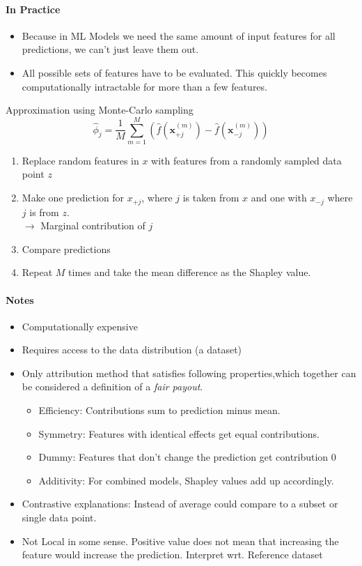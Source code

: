 \paragraph{In Practice}
\begin{itemize}
	\item Because in ML Models we need the same amount of input features for all predictions, we can't just leave them out.
	\item All possible sets of features have to be evaluated. This quickly becomes computationally intractable for more than a few features.
\end{itemize}
Approximation using Monte-Carlo sampling
\begin{equation}
	\hat{\phi}_{j} = \frac{1}{M}\sum_{m=1}^M\left(\hat{f}(\mathbf{x}^{(m)}_{+j}) - \hat{f}(\mathbf{x}^{(m)}_{-j})\right)
	\label{eq:mc-shapley}
\end{equation}
\begin{enumerate}
	\item Replace random features in $x$ with features from a randomly sampled data point $z$
	\item Make one prediction for $x_{+j}$, where $j$ is taken from $x$ and one with $x_{-j}$ where $j$ is from $z$.
	      \\ $\to$ Marginal contribution of $j$
	\item Compare predictions
	\item Repeat $M$ times and take the mean difference as the Shapley value.
\end{enumerate}
\paragraph{Notes}
\begin{itemize}
	\item Computationally expensive
	\item Requires access to the data distribution (a dataset)
	\item Only attribution method that satisfies following properties,which together can be considered a definition of a \textit{fair payout}.
	      \begin{itemize}
		      \item Efficiency: Contributions sum to prediction minus mean.
		      \item Symmetry: Features with identical effects get equal contributions.
		      \item Dummy: Features that don't change the prediction get contribution 0
		      \item Additivity: For combined models, Shapley values add up accordingly.
	      \end{itemize}
	\item Contrastive explanations: Instead of average could compare to a subset or single data point.
	\item Not Local in some sense. Positive value does not mean that increasing the feature would increase the prediction. Interpret wrt. Reference dataset
\end{itemize}

